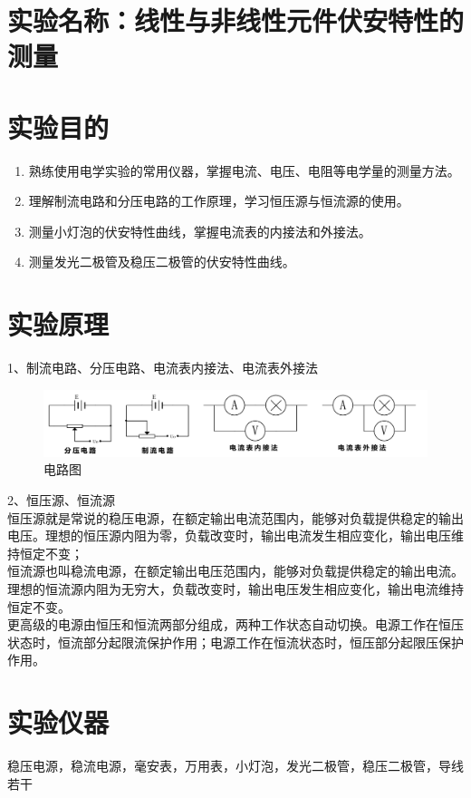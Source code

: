 \documentclass[12pt,a4paper]{article}
\begin{document}
	
	\section{实验名称：线性与非线性元件伏安特性的测量}
	
	\section{实验目的}
	\begin{enumerate}
		\item 熟练使用电学实验的常用仪器，掌握电流、电压、电阻等电学量的测量方法。
		\item 理解制流电路和分压电路的工作原理，学习恒压源与恒流源的使用。
		\item 测量小灯泡的伏安特性曲线，掌握电流表的内接法和外接法。
		\item 测量发光二极管及稳压二极管的伏安特性曲线。
	\end{enumerate}

	\section{实验原理}
	1、制流电路、分压电路、电流表内接法、电流表外接法
		\begin{figure}[H]
		\centering
		\includegraphics[width=1\textwidth]{电路图.png} %
		\caption{电路图}
		\label{fig:example}
	  	\end{figure}
	2、恒压源、恒流源\\
	恒压源就是常说的稳压电源，在额定输出电流范围内，能够对负载提供稳定的输出电压。理想的恒压源内阻为零，负载改变时，输出电流发生相应变化，输出电压维持恒定不变；\\
	恒流源也叫稳流电源，在额定输出电压范围内，能够对负载提供稳定的输出电流。理想的恒流源内阻为无穷大，负载改变时，输出电压发生相应变化，输出电流维持恒定不变。\\
	更高级的电源由恒压和恒流两部分组成，两种工作状态自动切换。电源工作在恒压状态时，恒流部分起限流保护作用；电源工作在恒流状态时，恒压部分起限压保护作用。
	
	\section{实验仪器}
	稳压电源，稳流电源，毫安表，万用表，小灯泡，发光二极管，稳压二极管，导线若干
\end{document}

